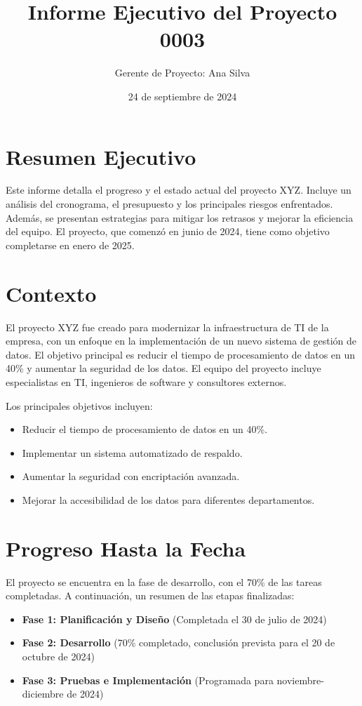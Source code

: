 \documentclass[12pt]{article}
\title{Informe Ejecutivo del Proyecto 0003}
\author{Gerente de Proyecto: Ana Silva}
\date{24 de septiembre de 2024}
\begin{document}
\maketitle

\tableofcontents
\newpage

\section*{Resumen Ejecutivo}
Este informe detalla el progreso y el estado actual del proyecto XYZ. Incluye un análisis del cronograma, el presupuesto y los principales riesgos enfrentados. Además, se presentan estrategias para mitigar los retrasos y mejorar la eficiencia del equipo. El proyecto, que comenzó en junio de 2024, tiene como objetivo completarse en enero de 2025.

\section*{Contexto}
El proyecto XYZ fue creado para modernizar la infraestructura de TI de la empresa, con un enfoque en la implementación de un nuevo sistema de gestión de datos. El objetivo principal es reducir el tiempo de procesamiento de datos en un 40\% y aumentar la seguridad de los datos. El equipo del proyecto incluye especialistas en TI, ingenieros de software y consultores externos.

Los principales objetivos incluyen:
\begin{itemize}
    \item Reducir el tiempo de procesamiento de datos en un 40\%.
    \item Implementar un sistema automatizado de respaldo.
    \item Aumentar la seguridad con encriptación avanzada.
    \item Mejorar la accesibilidad de los datos para diferentes departamentos.
\end{itemize}

\section*{Progreso Hasta la Fecha}
El proyecto se encuentra en la fase de desarrollo, con el 70\% de las tareas completadas. A continuación, un resumen de las etapas finalizadas:

\begin{itemize}
    \item \textbf{Fase 1: Planificación y Diseño} (Completada el 30 de julio de 2024)
    \item \textbf{Fase 2: Desarrollo} (70\% completado, conclusión prevista para el 20 de octubre de 2024)
    \item \textbf{Fase 3: Pruebas e Implementación} (Programada para noviembre-diciembre de 2024)
\end{itemize}
\end{document}
